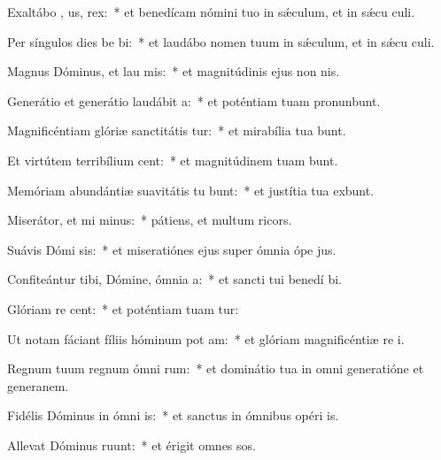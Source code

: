 \item Exaltábo ,  us, rex:~* et benedícam nómini tuo in sǽculum, et in sǽcu culi.
\item Per síngulos dies be bi:~* et laudábo nomen tuum in sǽculum, et in sǽcu culi.
\item Magnus Dóminus, et lau mis:~* et magnitúdinis ejus non  nis.
\item Generátio et generátio laudábit  a:~* et poténtiam tuam pronunbunt.
\item Magnificéntiam glóriæ sanctitátis  tur:~* et mirabília tua bunt.
\item Et virtútem terribílium  cent:~* et magnitúdinem tuam bunt.
\item Memóriam abundántiæ suavitátis tu bunt:~* et justítia tua exbunt.
\item Miserátor, et mi minus:~* pátiens, et multum ricors.
\item Suávis Dómi sis:~* et miseratiónes ejus super ómnia ópe jus.
\item Confiteántur tibi, Dómine, ómnia  a:~* et sancti tui benedí bi.
\item Glóriam re  cent:~* et poténtiam tuam tur:
\item Ut notam fáciant fíliis hóminum pot am:~* et glóriam magnificéntiæ re i.
\item Regnum tuum regnum ómni rum:~* et dominátio tua in omni generatióne et generanem.
\item Fidélis Dóminus in ómni  is:~* et sanctus in ómnibus opéri is.
\item Allevat Dóminus   ruunt:~* et érigit omnes sos.
